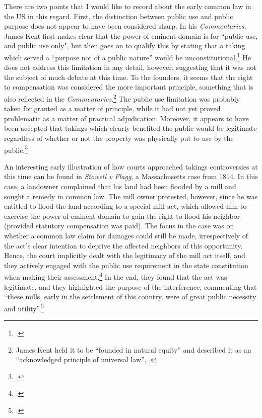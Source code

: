\documentclass[12pt,a4paper]{book} %
\begin{document}
There are two points that I would like to record about the early common law in the US  in this regard. First, the distinction between public use and public purpose does not appear to have been considered sharp. In his {\it Commentaries}, James Kent first makes clear that the power of eminent domain is for ``public use, and public use only", but then goes on to qualify this by stating that a taking which served a ``purpose not of a public nature'' would be unconstitutional.\footcite[See][275-276]{kent27}  He does not address this limitation in any detail, however, suggesting that it was not the subject of much debate at this time. To the founders, it seems that the right to compensation was considered the more important principle, something that is also reflected in the {\it Commentaries}.\footnote{James Kent held it to be  ``founded in natural equity'' and described it as an ``acknowledged principle of universal law'', \cite[see][276]{kent27}.} The public use limitation was probably taken for granted as a matter of principle, while it had not yet proved problematic as a matter of practical adjudication. Moreover, it appears to have been accepted that takings which clearly benefited the public would be legitimate regardless of whether or not the property was physically put to use by the public.\footcite{johnson11}

An interesting early illustration of how courts approached takings controversies at this time can be found in {\it Stowell v Flagg}, a Massachusetts case from 1814. In this case, a landowner complained that his land had been flooded by a mill and sought a remedy in common law. The mill owner protested, however, since he was entitled to flood the land according to a special mill act, which allowed him to exercise the power of eminent domain to gain the right to flood his neighbor (provided statutory compensation was paid). The focus in the case was on whether a common law claim for damages could still be made, irrespectively of the act's clear intention to deprive the affected neighbors of this opportunity. Hence, the court implicitly dealt with the legitimacy of the mill act itself, and they actively engaged with the public use requirement in the state constitution when making their assessment.\footcite{stowell14} In the end, they found that the act was legitimate, and they highlighted the purpose of the interference, commenting that ``these mills, early in the settlement of this country, were of great public necessity and utility''.\footcite[366]{stowell14} 
\end{document}
